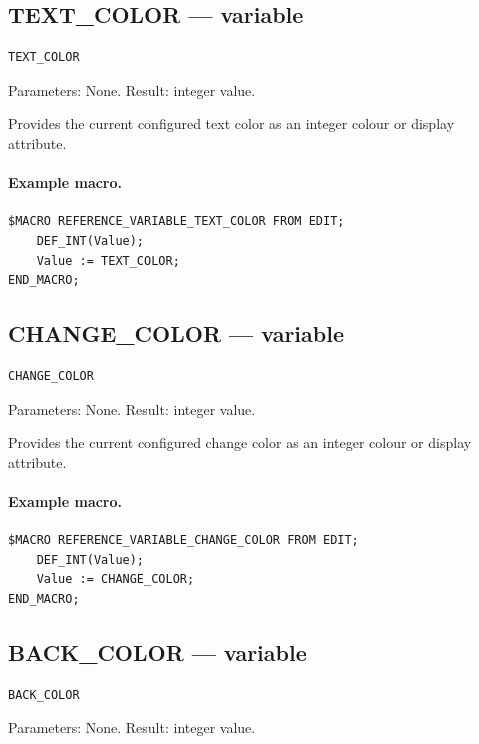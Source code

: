 \documentclass[a4paper,10pt,twoside,openany]{book}
\begin{document}
\subsection*{TEXT\_COLOR --- variable}
\begin{verbatim}
TEXT_COLOR
\end{verbatim}
Parameters: None. Result: integer value.

Provides the current configured text color as an integer colour or display attribute.

\paragraph{Example macro.}
\begin{verbatim}
$MACRO REFERENCE_VARIABLE_TEXT_COLOR FROM EDIT;
    DEF_INT(Value);
    Value := TEXT_COLOR;
END_MACRO;
\end{verbatim}

\label{prim:variable-change-color}
\subsection*{CHANGE\_COLOR --- variable}
\begin{verbatim}
CHANGE_COLOR
\end{verbatim}
Parameters: None. Result: integer value.

Provides the current configured change color as an integer colour or display attribute.

\paragraph{Example macro.}
\begin{verbatim}
$MACRO REFERENCE_VARIABLE_CHANGE_COLOR FROM EDIT;
    DEF_INT(Value);
    Value := CHANGE_COLOR;
END_MACRO;
\end{verbatim}

\label{prim:variable-back-color}
\subsection*{BACK\_COLOR --- variable}
\begin{verbatim}
BACK_COLOR
\end{verbatim}
Parameters: None. Result: integer value.
\end{document}
